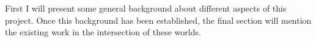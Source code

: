 First I will present some general background about different aspects of this project.
Once this background has been established,
the final section will mention the existing work in the intersection of these worlds.
